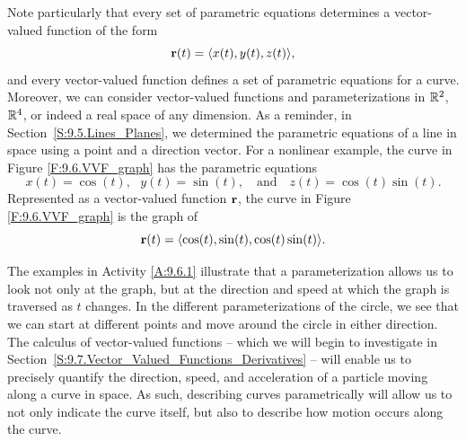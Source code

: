 \vspace*{5pt}
\nin {}
\vspace*{5pt}

Note particularly that every set of parametric equations determines a
vector-valued function of the form
\[\mathbf{r}(t) = \langle x(t), y(t), z(t) \rangle,\]
and every vector-valued function defines a set of parametric equations
for a curve.  Moreover, we can consider vector-valued functions and
parameterizations in $\mathbb{R}^2$, $\mathbb{R}^4$, or indeed a real space of any
dimension.  As a reminder, in Section~\ref{S:9.5.Lines_Planes}, we
determined the parametric equations of a line in space using a point
and a direction vector.  For a nonlinear example, the curve in Figure
\ref{F:9.6.VVF_graph} has the parametric equations
\[x(t) = \cos(t), \ \ \ y(t) = \sin(t), \ \ \ \text{ and } \ \ \ z(t)
= \cos(t) \sin(t).\] Represented as a vector-valued function $\mathbf{r}$,
the curve in Figure \ref{F:9.6.VVF_graph} is the graph of
\[\mathbf{r}(t) = \langle \cos(t), \sin(t), \cos(t) \sin(t) \rangle.\]




The examples in Activity \ref{A:9.6.1} illustrate that a
parameterization allows us to look not only at the graph, but at the
direction and speed at which the graph is traversed as $t$ changes. In
the different parameterizations of the circle, we see that we can 
start at different points and move around the circle in either
direction.  The calculus of vector-valued functions -- which we will
begin to investigate in
Section~\ref{S:9.7.Vector_Valued_Functions_Derivatives} -- will enable
us to precisely quantify the direction, speed, and acceleration of a
particle moving along a curve in space.  As such, describing curves
parametrically will allow us to not only indicate the curve itself,
but also to describe how motion occurs along the curve.

